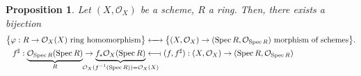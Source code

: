 \documentclass[12pt]{article}
\DeclareMathOperator{\Spec}{Spec}
\newtheorem*{proposition}{Proposition}
\theoremstyle{definition}
\begin{document}
\begin{proposition}
Let $(X,\mathcal O_X)$ be a scheme, $R$ a ring. Then, there exists a bijection
\begin{align*}
\big\{\varphi:R\rightarrow\mathcal O_X(X)\text{ ring homomorphism}\big\}&\xleftrightarrow{\hspace{4.4mm}}\big\{(X,\mathcal O_X)\rightarrow(\Spec R,\mathcal O_{\Spec R})\text{ morphism of schemes}\big\}.\\f^\sharp:\underbrace{\mathcal O_{\Spec R}(\Spec R)}_R\rightarrow\underbrace{f_*\mathcal O_X(\Spec R)}_{\mathclap{\mathcal O_X(f^{-1}(\Spec R))=\mathcal O_X(X)}}&\longleftarrow\!\shortmid(f,f^\sharp):(X,\mathcal O_X)\rightarrow(\Spec R,\mathcal O_{\Spec R})
\end{align*}
\end{proposition}
\end{document}
